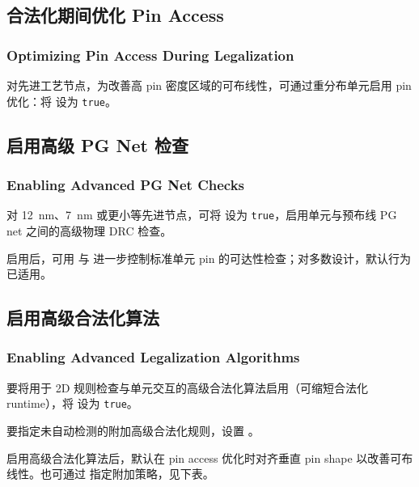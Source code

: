 \subsection{合法化期间优化 Pin Access}
\subsubsection*{Optimizing Pin Access During Legalization}

对先进工艺节点，为改善高 pin 密度区域的可布线性，可通过重分布单元启用 pin 优化：将  设为 \texttt{true}。

\subsection{启用高级 PG Net 检查}
\subsubsection*{Enabling Advanced PG Net Checks}

对 12~nm、7~nm 或更小等先进节点，可将  设为 \texttt{true}，启用单元与预布线 PG net 之间的高级物理 DRC 检查。

启用后，可用  与  进一步控制标准单元 pin 的可达性检查；对多数设计，默认行为已适用。

\subsection{启用高级合法化算法}
\subsubsection*{Enabling Advanced Legalization Algorithms}

要将用于 2D 规则检查与单元交互的高级合法化算法启用（可缩短合法化 runtime），将  设为 \texttt{true}。

要指定未自动检测的附加高级合法化规则，设置 。

启用高级合法化算法后，默认在 pin access 优化时对齐垂直 pin shape 以改善可布线性。也可通过  指定附加策略，见下表。

